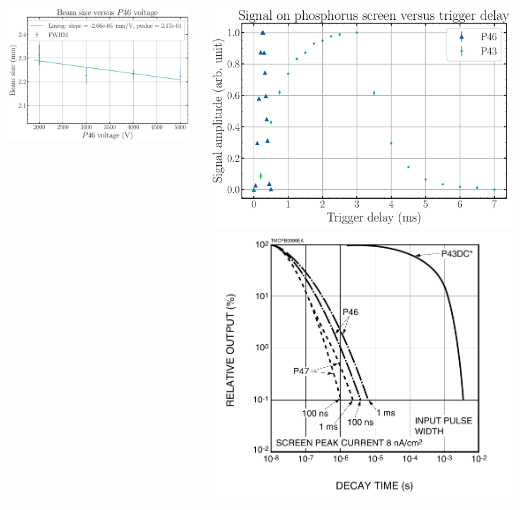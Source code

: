 \begin{frame}[t]
\begin{columns}[T]
\begin{column}{0.45\textwidth}
{      \includegraphics[width=1\textwidth]{06_Backup/fig/fig000_P46_size}%
      }%
    \end{column}
    \begin{column}{0.45\textwidth}
      \includegraphics[width=1\textwidth]{06_Backup/fig/fig000_timing}
      \includegraphics[width=1\textwidth]{06_Backup/fig/fig000_Hamamatu_phos}

\end{column}
\end{columns}
\end{frame}

